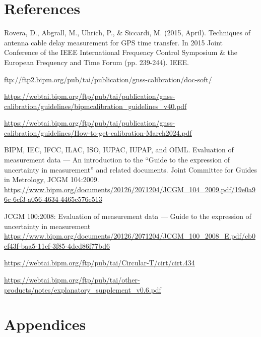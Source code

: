 \documentclass[11pt]{article}
\begin{document}
\newpage
\appendix
\renewcommand{\thesection}{\Alph{section}}
\renewcommand{\thesubsection}{\roman{subsection}}
\renewcommand{\theequation}{A-\arabic{equation}}





\newpage
\part*{References}

\begin{thebibliography}{9}

Rovera, D., Abgrall, M., Uhrich, P., \& Siccardi, M. (2015, April). Techniques of antenna cable delay measurement for GPS time transfer. In 2015 Joint Conference of the IEEE International Frequency Control Symposium \& the European Frequency and Time Forum (pp. 239-244). IEEE.

\url{ftp://ftp2.bipm.org/pub/tai/publication/gnss-calibration/doc-soft/}

\url{https://webtai.bipm.org/ftp/pub/tai/publication/gnss-calibration/guidelines/bipmcalibration_guidelines_v40.pdf}

\url{https://webtai.bipm.org/ftp/pub/tai/publication/gnss-calibration/guidelines/How-to-get-calibration-March2024.pdf}

BIPM, IEC, IFCC, ILAC, ISO, IUPAC, IUPAP, and OIML. Evaluation of measurement data — An introduction to the “Guide to the expression of uncertainty in measurement” and related documents.
Joint Committee for Guides in Metrology, JCGM 104:2009. \url{https://www.bipm.org/documents/20126/2071204/JCGM_104_2009.pdf/19e0a96c-6cf3-a056-4634-4465c576e513}

JCGM 100:2008: Evaluation of measurement data — Guide to the expression of uncertainty in measurement \url{https://www.bipm.org/documents/20126/2071204/JCGM_100_2008_E.pdf/cb0ef43f-baa5-11cf-3f85-4dcd86f77bd6}

\url{https://webtai.bipm.org/ftp/pub/tai/Circular-T/cirt/cirt.434}

\url{https://webtai.bipm.org/ftp/pub/tai/other-products/notes/explanatory_supplement_v0.6.pdf}

\end{thebibliography}

\part*{Appendices}



\end{document}
